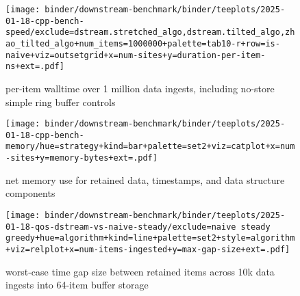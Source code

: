 \begin{figure*}

\begin{subfigure}{\textwidth}
\centering
\texttt{[image: binder/downstream-benchmark/binder/teeplots/2025-01-18-cpp-bench-speed/exclude=dstream.stretched\_algo,dstream.tilted\_algo,zhao\_tilted\_algo+num\_items=1000000+palette=tab10-r+row=is-naive+viz=outsetgrid+x=num-sites+y=duration-per-item-ns+ext=.pdf]}
\caption{per-item walltime over 1 million data ingests, including no-store simple ring buffer controls}
\label{fig:perf:speed}
\end{subfigure}

\begin{subfigure}{0.38\textwidth}
\texttt{[image: binder/downstream-benchmark/binder/teeplots/2025-01-18-cpp-bench-memory/hue=strategy+kind=bar+palette=set2+viz=catplot+x=num-sites+y=memory-bytes+ext=.pdf]}
\centering
\begin{minipage}{0.9\textwidth}
\caption{net memory use for retained data, timestamps, and data structure components}
\label{fig:perf:memory}
\end{minipage}
\end{subfigure}%
\begin{subfigure}{0.62\textwidth}
\texttt{[image: binder/downstream-benchmark/binder/teeplots/2025-01-18-qos-dstream-vs-naive-steady/exclude=naive steady greedy+hue=algorithm+kind=line+palette=set2+style=algorithm+viz=relplot+x=num-items-ingested+y=max-gap-size+ext=.pdf]}
\centering
\begin{minipage}{0.9\textwidth}
\caption{worst-case time gap size between retained items across 10k data ingests into 64-item buffer storage}
\label{fig:perf:qos}
\end{minipage}
\end{subfigure}

\caption{
\textbf{DownStream steady curation improves speed and memory footprint, while maintaining equivalent or smaller time gaps between retained data items.}
On-hardware performance downsampling from single-bit data stream for proposed ``dstream'' algorithm is compared against existing ``naive'' approach \citep{zhao2005generalized}, which requires storage of a timestamp delta with each retained data item.
Across surveyed conditions, the dstream approach provided between $2.5\times$ and $72\times$ speedup over the naive approach, shown in subpanel \ref{fig:perf:speed}.
In fact, dstream performance closely resembles that of our minimal no-store control.
Over shorter data streams, where a smaller fraction of data items are discarded, dstream performance more closely resembles that of the ring buffer control (Figure \ref{fig:perf-num-ingests}).
Shaded bands represent bootstrapped 95\% CI over 40 replicate timings.
In the case of single-bit data items, dstream also reduces memory use --- shown in subpanel \ref{fig:perf:memory} --- more than 30-fold, owing to omission of 32-bit timestamp deltas.
Finally, subpanel \ref{fig:perf:qos} compares growth rates for maximimal time gap among retained items.
Here, dstream behavior closely matches, or slightly improves, the naive approach.
}
\label{fig:perf}
\end{figure*}
